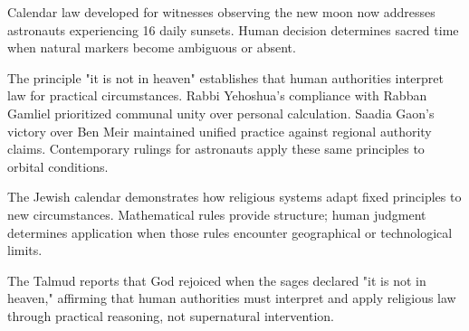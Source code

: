 Calendar law developed for witnesses observing the new moon now addresses astronauts experiencing 16 daily sunsets. Human decision determines sacred time when natural markers become ambiguous or absent.

The principle "it is not in heaven" establishes that human authorities interpret law for practical circumstances. Rabbi Yehoshua's compliance with Rabban Gamliel prioritized communal unity over personal calculation. Saadia Gaon's victory over Ben Meir maintained unified practice against regional authority claims. Contemporary rulings for astronauts apply these same principles to orbital conditions.

The Jewish calendar demonstrates how religious systems adapt fixed principles to new circumstances. Mathematical rules provide structure; human judgment determines application when those rules encounter geographical or technological limits.

The Talmud reports that God rejoiced when the sages declared "it is not in heaven," affirming that human authorities must interpret and apply religious law through practical reasoning, not supernatural intervention.

